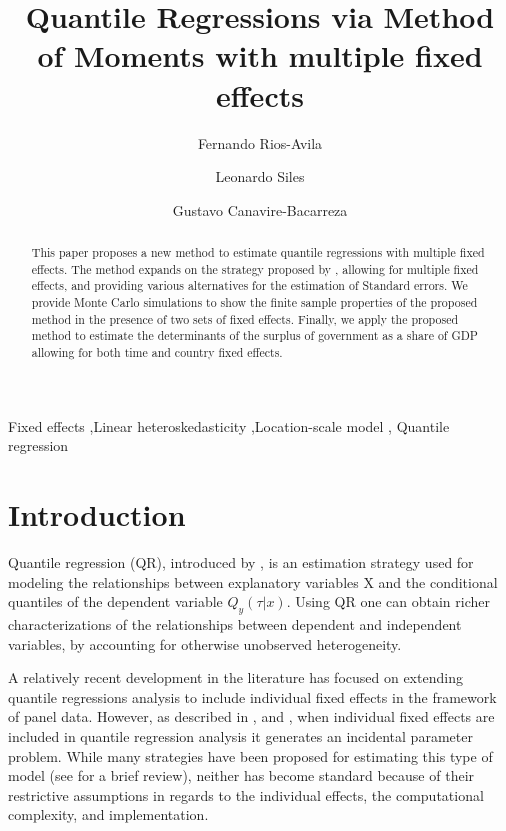 \documentclass[
  authoryear,
  review,
  1p]{elsarticle}
\begin{document}
\begin{frontmatter}
\title{Quantile Regressions via Method of Moments with multiple fixed
effects }
\author[1]{Fernando Rios-Avila%
%
}
\author[2]{Leonardo Siles%
%
}
\author[3]{Gustavo Canavire-Bacarreza%
%
}





        
\begin{abstract}
This paper proposes a new method to estimate quantile regressions with
multiple fixed effects. The method expands on the strategy proposed by
\citet{mss2019}, allowing for multiple fixed effects, and providing
various alternatives for the estimation of Standard errors. We provide
Monte Carlo simulations to show the finite sample properties of the
proposed method in the presence of two sets of fixed effects. Finally,
we apply the proposed method to estimate the determinants of the surplus
of government as a share of GDP allowing for both time and country fixed
effects.
\end{abstract}





\begin{keyword}
    Fixed effects \sep Linear heteroskedasticity \sep Location-scale
model \sep 
    Quantile regression
\end{keyword}
\end{frontmatter}
    \section{Introduction}\label{introduction}

Quantile regression (QR), introduced by \citet{koenkerbasset1978}, is an
estimation strategy used for modeling the relationships between
explanatory variables X and the conditional quantiles of the dependent
variable \(Q_y (\tau|x)\). Using QR one can obtain richer
characterizations of the relationships between dependent and independent
variables, by accounting for otherwise unobserved heterogeneity.

A relatively recent development in the literature has focused on
extending quantile regressions analysis to include individual fixed
effects in the framework of panel data. However, as described in
\citet{neymanscott1948}, and \citet{lancaster2000}, when individual
fixed effects are included in quantile regression analysis it generates
an incidental parameter problem. While many strategies have been
proposed for estimating this type of model (see
\citet{galvao2017quantile} for a brief review), neither has become
standard because of their restrictive assumptions in regards to the
individual effects, the computational complexity, and implementation.
\end{document}
